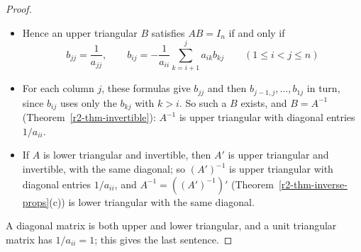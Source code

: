 \documentclass[12pt]{article}
\newcommand{\R}{\mathbb R}
\theoremstyle{definition}
\begin{document}
\begin{proof}
\begin{enumerate}
\begin{itemize}
\(B\in\R^{n\times n}\), \(AB\) is upper triangular with diagonal entries \(a_{ii}b_{ii}\)
(Proposition~\ref{r1-prop-diag}(c)), and \((AB)_{ij}=\sum_{k=i}^ja_{ik}b_{kj}\) for \(i<j\), since \(a_{ik}=0\) for
\(k<i\) and \(b_{kj}=0\) for \(k>j\).
\item Hence an upper triangular \(B\) satisfies \(AB=I_n\) if and only if
\[
b_{jj}=\frac1{a_{jj}},\qquad b_{ij}=-\frac1{a_{ii}}\sum_{k=i+1}^ja_{ik}b_{kj}\qquad(1\leqslant i<j\leqslant n)
\]
\item For each column \(j\), these formulas give \(b_{jj}\) and then \(b_{j-1,j},\dots,b_{1j}\) in turn, since
\(b_{ij}\) uses only the \(b_{kj}\) with \(k>i\). So such a \(B\) exists, and \(B=A^{-1}\)
(Theorem~\ref{r2-thm-invertible}): \(A^{-1}\) is upper triangular with diagonal entries \(1/a_{ii}\).
\item If \(A\) is lower triangular and invertible, then \(A'\) is upper triangular and invertible, with the same
diagonal; so \((A')^{-1}\) is upper triangular with diagonal entries \(1/a_{ii}\), and
\(A^{-1}=((A')^{-1})'\) (Theorem~\ref{r2-thm-inverse-props}(c)) is lower triangular with the same diagonal.
\end{itemize}
\end{enumerate}
A diagonal matrix is both upper and lower triangular, and a unit triangular matrix has \(1/a_{ii}=1\); this gives
the last sentence.
\end{proof}
\end{document}
